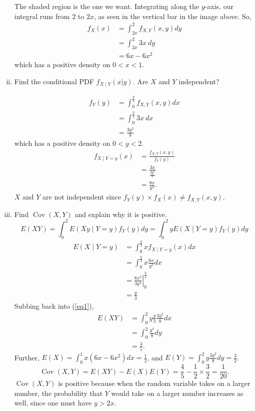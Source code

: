 \documentclass{article}
\DeclareMathOperator{\Cov}{Cov}
\begin{document}
\begin{enumerate}[i)]
The shaded region is the one we want. Integrating along the $y$-axis, our integral runs from $2$ to $2x$, as seen in the vertical bar in the image above. So,
\begin{align*}
    f_X(x) &= \int_{2x}^2 f_{X, Y} (x,y) dy \\
    &= \int_{2x}^2 3x \ dy \\
    &= 6x -6x^2
\end{align*}
which has a positive density on $0<x<1$.
\item Find the conditional PDF $f_{X \mid Y} (x| y)$. Are $X$ and $Y$ independent?

\begin{align*}
    f_Y(y) &= \int^{\frac{y}{2}}_0 f_{X, Y} (x,y) dx \\
    &=\int^{\frac{y}{2}}_0 3x \ dx \\
    &= \frac{3y^2}{8} 
\end{align*}
which has a positive density on $0<y<2$.
\begin{align*}
    f_{X \mid Y=y}(x) &= \frac{f_{X, Y} (x,y)}{f_Y(y)} \\
    &= \frac{3x}{\frac{3y^2}{8}}\\
    &=\frac{8x}{y^2}.
\end{align*}
$X$ and $Y$ are not independent since $f_Y(y) \times f_X(x) \neq  f_{X, Y} (x,y)$.
\item Find $\Cov(X,Y)$ and explain why it is positive.
\begin{equation}
    E(XY) = \int_0^2 E(Xy \mid Y=y) f_Y(y) dy = \int_0^2 y E(X \mid Y=y) f_Y(y) dy \label{eq1}
\end{equation}
\begin{align*}
    E(X \mid Y=y) &= \int_0^{\frac{y}{2}} xf_{X \mid Y=y}(x) dx \\
    &= \int_0^{\frac{y}{2}} x\frac{8x}{y^2} dx \\
    &= \left.\frac{8x^3}{3y^2}\right|_0^{\frac{y}{2}} \\
    &= \frac{y}{3}
\end{align*}
Subbing back into (\ref{eq1}),
\begin{align*}
    E(XY) &= \int_0^2 y \frac{y}{3} \frac{3y^2}{8} dx \\
    &= \int_0^2 \frac{y^4}{8} dy \\
    &= \frac{4}{5}.
\end{align*}
Further, $E(X) = \int_0^1 x(6x-6x^2) dx = \frac{1}{2}$, and $E(Y)= \int_0^2 y \frac{3y^2}{8} dy = \frac{3}{2}$.
\begin{equation*}
    \Cov(X,Y) = E(XY)-E(X)E(Y) = \frac{4}{5} - \frac{1}{2} \times \frac{3}{2} = \frac{1}{20}.
\end{equation*}
$\Cov(X,Y)$ is positive because when the random variable takes on a larger number, the probability that $Y$ would take on a larger number increases as well, since one must have $y>2x$.
\end{enumerate}
\end{document}
